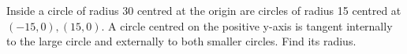 Inside a circle of radius 30 centred at the origin are circles of radius 15 centred at $(-15,0),(15,0)$. A circle centred on the positive y-axis is tangent internally to the large circle and externally to both smaller circles. Find its radius.
